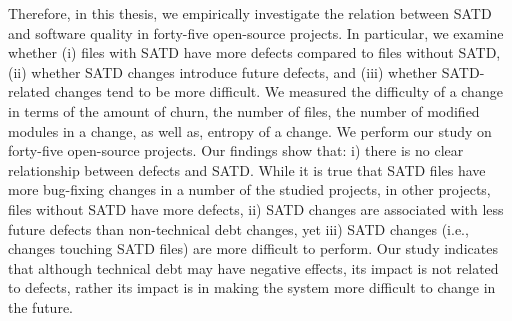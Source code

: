 Therefore, in this thesis, we empirically investigate the relation between SATD and software quality in forty-five open-source projects. In particular, we examine whether (i) files with SATD have more defects compared to files without SATD, (ii) whether SATD changes introduce future defects, and (iii) whether SATD-related changes tend to be more difficult. We measured the difficulty of a change in terms of the amount of churn, the number of files, the number of modified modules in a change, as well as, entropy of a change. We perform our study on forty-five open-source projects. Our findings show that: i) there is no clear relationship between defects and SATD. While it is true that SATD files have more bug-fixing changes in a number of the studied projects, in other projects, files without SATD have more defects, ii) SATD changes are associated with less future defects than non-technical debt changes, yet iii) SATD changes (i.e., changes touching SATD files) are more difficult to perform. Our study indicates that although technical debt may have negative effects, its impact is not related to defects, rather its impact is in making the system more difficult to change in the future.